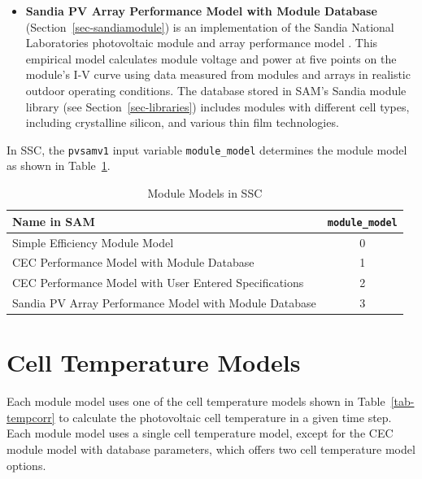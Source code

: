\documentclass[12pt,letterpaper]{article}
\begin{document}
\begin{itemize}
\item \textbf{Sandia PV Array Performance Model with Module Database}  (Section~\ref{sec-sandiamodule}) is an implementation of the Sandia National Laboratories photovoltaic module and array performance model \citep{king2004}. This empirical model calculates module voltage and power at five points on the module's I-V curve using data measured from modules and arrays in realistic outdoor operating conditions. The database stored in SAM's Sandia module library (see Section~\ref{sec-libraries}) includes modules with different cell types, including crystalline silicon, and various thin film technologies.
\end{itemize}

In SSC, the \texttt{pvsamv1} input variable \texttt{module\_model} determines the module model as shown in Table~\ref{tab-modulesubmodels}.

\begin{table}
\begin{center}
\caption{Module Models in SSC}
\begin{tabular}{lc}
\midrule
Name in SAM & \texttt{module\_model} \\
\midrule
Simple Efficiency Module Model & 0 \\
CEC Performance Model with Module Database & 1 \\
CEC Performance Model with User Entered Specifications & 2 \\
Sandia PV Array Performance Model with Module Database & 3 \\
\hline
\end{tabular}
\label{tab-modulesubmodels}
\end{center}
\end{table}

\section{Cell Temperature Models}\label{sec-celltempoptions}

Each module model uses one of the cell temperature models shown in Table~\ref{tab-tempcorr} to calculate the photovoltaic cell temperature in a given time step. Each module model uses a single cell temperature model, except for the CEC module model with database parameters, which offers two cell temperature model options.
\end{document}

